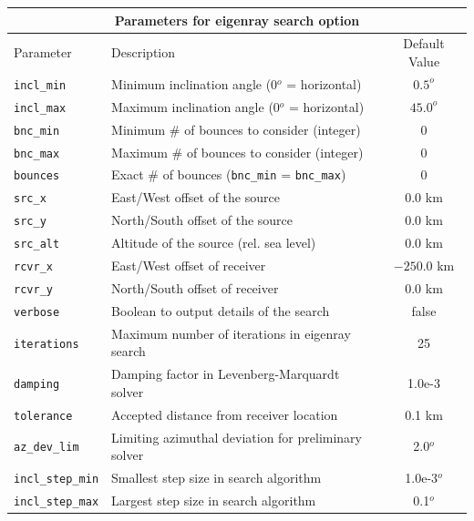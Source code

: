 \documentclass[10pt]{article}
\begin{document}
\begin{tabular}{ | l | l | c | }
  \hline
  \multicolumn{3}{|c|}{\textbf{Parameters for eigenray search option}} \\
  \hline
  Parameter & Description & Default Value \\
  \hline \hline
 \verb=incl_min= 		& Minimum inclination angle (0\(^o\) = horizontal)			& \(0.5^o\)	\\
 \verb=incl_max= 		& Maximum inclination angle (0\(^o\) = horizontal)			& \(45.0^o\) \\ \hline
 \verb=bnc_min=		& Minimum \# of bounces to consider (integer) 				& 0 \\ 
 \verb=bnc_max=		& Maximum \# of bounces to consider (integer) 				& 0 \\ 
 \verb=bounces=		& Exact \# of bounces (\verb=bnc_min= = \verb=bnc_max=)	& 0 \\ \hline
 \verb=src_x=  			& East/West offset of the source						& \(0.0\) km \\
 \verb=src_y=  			& North/South offset of the source						& \(0.0\) km \\
 \verb=src_alt=  		& Altitude of the source (rel. sea level)					& \(0.0\) km \\ \hline
 \verb=rcvr_x= 			& East/West offset of receiver							& \(-250.0\) km	\\
 \verb=rcvr_y= 			& North/South offset of receiver							& \(0.0\) km \\ \hline
 \verb=verbose=		& Boolean to output details of the search					& false \\
 \verb=iterations=		& Maximum number of iterations in eigenray search			& 25 \\ 
 \verb=damping=		& Damping factor in Levenberg-Marquardt solver			& 1.0e-3 \\
 \verb=tolerance=		& Accepted distance from receiver location				& 0.1 km \\
 \verb=az_dev_lim=		& Limiting azimuthal deviation for preliminary solver			& 2.0\(^o\) \\
 \verb=incl_step_min=	& Smallest step size in search algorithm					& 1.0e-3\(^o\)\\
 \verb=incl_step_max=	& Largest step size in search algorithm					& 0.1\(^o\) \\ \hline
\end{tabular}

\vspace{0.01\textheight}
\end{document}
